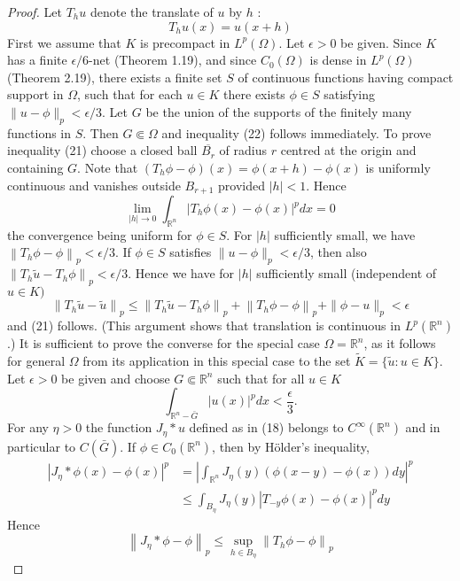 \begin{proof}
  Let $T_h u$ denote the translate of $u$ by $h$ :
  \[
  T_h u(x)=u(x+h)
  \]
  First we assume that $K$ is precompact in $L^p(\Omega)$. Let $\epsilon>0$ be given. Since $K$ has a finite $\epsilon / 6$-net (Theorem 1.19), and since $C_0(\Omega)$ is dense in $L^p(\Omega)$ (Theorem 2.19), there exists a finite set $S$ of continuous functions having compact support in $\Omega$, such that for each $u \in K$ there exists $\phi \in S$ satisfying $\|u-\phi\|_p<\epsilon / 3$. Let $G$ be the union of the supports of the finitely many functions in $S$. Then $G \Subset \Omega$ and inequality (22) follows immediately. To prove inequality (21) choose a closed ball $\overline{B_r}$ of radius $r$ centred at the origin and containing $G$. Note that $\left(T_h \phi-\phi\right)(x)=\phi(x+h)-\phi(x)$ is uniformly continuous and vanishes outside $B_{r+1}$ provided $|h|<1$. Hence
  \[
  \lim _{|h| \rightarrow 0} \int_{\mathbb{R}^n}\left|T_h \phi(x)-\phi(x)\right|^p d x=0
  \]
  the convergence being uniform for $\phi \in S$. For $|h|$ sufficiently small, we have $\left\|T_h \phi-\phi\right\|_p<\epsilon / 3$. If $\phi \in S$ satisfies $\|u-\phi\|_p<\epsilon / 3$, then also $\left\|T_h \tilde{u}-T_h \phi\right\|_p<\epsilon / 3$. Hence we have for $|h|$ sufficiently small (independent of $u \in K)$
  \[
  \left\|T_h \tilde{u}-\tilde{u}\right\|_p \leq\left\|T_h \tilde{u}-T_h \phi\right\|_p+\left\|T_h \phi-\phi\right\|_p+\|\phi-u\|_p<\epsilon
  \]
  and (21) follows. (This argument shows that translation is continuous in $L^p(\mathbb{R}^n)$.)
  It is sufficient to prove the converse for the special case $\Omega=\mathbb{R}^n$, as it follows for general $\Omega$ from its application in this special case to the set $\tilde{K}=\{\tilde{u}: u \in K\}$.
  Let $\epsilon>0$ be given and choose $G \Subset \mathbb{R}^n$ such that for all $u \in K$
  \[
  \int_{\mathbb{R}^n-\bar{G}}|u(x)|^p d x<\frac{\epsilon}{3} .
  \]
  For any $\eta>0$ the function $J_\eta * u$ defined as in (18) belongs to $C^{\infty}(\mathbb{R}^n)$ and in particular to $C(\bar{G})$. If $\phi \in C_0(\mathbb{R}^n)$, then by Hölder's inequality,
  \[
  \begin{aligned}
  \left|J_\eta * \phi(x)-\phi(x)\right|^p & =\left|\int_{\mathbb{R}^n} J_\eta(y)(\phi(x-y)-\phi(x)) d y\right|^p \\
  & \leq \int_{B_\eta} J_\eta(y)\left|T_{-y} \phi(x)-\phi(x)\right|^p d y
  \end{aligned}
  \]
  Hence
  \[
  \left\|J_\eta * \phi-\phi\right\|_p \leq \sup _{h \in B_\eta}\left\|T_h \phi-\phi\right\|_p
\]
\end{proof}
